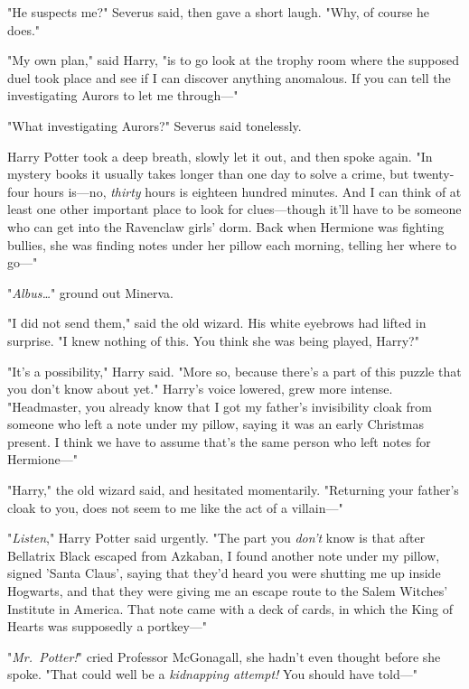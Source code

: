 "He suspects me?" Severus said, then gave a short laugh. "Why, of course he does."

"My own plan," said Harry, "is to go look at the trophy room where the supposed duel took place and see if I can discover anything anomalous. If you can tell the investigating Aurors to let me through---"

"What investigating Aurors?" Severus said tonelessly.

Harry Potter took a deep breath, slowly let it out, and then spoke again. "In mystery books it usually takes longer than one day to solve a crime, but twenty-four hours is---no, \emph{thirty} hours is eighteen hundred minutes. And I can think of at least one other important place to look for clues---though it'll have to be someone who can get into the Ravenclaw girls' dorm. Back when Hermione was fighting bullies, she was finding notes under her pillow each morning, telling her where to go---"

"\emph{Albus{\ldots}}" ground out Minerva.

"I did not send them," said the old wizard. His white eyebrows had lifted in surprise. "I knew nothing of this. You think she was being played, Harry?"

"It's a possibility," Harry said. "More so, because there's a part of this puzzle that you don't know about yet." Harry's voice lowered, grew more intense. "Headmaster, you already know that I got my father's invisibility cloak from someone who left a note under my pillow, saying it was an early Christmas present. I think we have to assume that's the same person who left notes for Hermione---"

"Harry," the old wizard said, and hesitated momentarily. "Returning your father's cloak to you, does not seem to me like the act of a villain---"

"\emph{Listen}," Harry Potter said urgently. "The part you \emph{don't} know is that after Bellatrix Black escaped from Azkaban, I found another note under my pillow, signed 'Santa Claus', saying that they'd heard you were shutting me up inside Hogwarts, and that they were giving me an escape route to the Salem Witches' Institute in America. That note came with a deck of cards, in which the King of Hearts was supposedly a portkey---"

"\emph{Mr.~Potter!}" cried Professor McGonagall, she hadn't even thought before she spoke. "That could well be a \emph{kidnapping attempt!} You should have told---"

